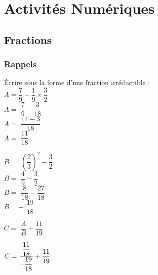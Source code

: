 \ifdefined\COMPLETE
\else
    
    
\fi

\section{Activités Numériques}

\subsection{Fractions}

\subsubsection{Rappels}



Écrire sous la forme d'une fraction irréductible :\\

$ A = ${$\dfrac{7}{9} - \dfrac{1}{9} \times \dfrac{3}{2} $ }\\

$ A = ${  $\dfrac{7}{9} - \dfrac{3}{18} $}\\

$ A = ${  $\dfrac{14-3}{18} $ }\\

$ A = ${  $\dfrac{11}{18} $ }\\

\vspace{1cm}

$ B = ${  $\left(\dfrac{2}{3}\right)^2 - \dfrac{3}{2} $ }\\

$ B = ${  $\dfrac{4}{9} - \dfrac{3}{2} $ }\\

$ B = ${  $\dfrac{8}{18} - \dfrac{27}{18} $} \\

$ B = - ${  $\dfrac{19}{18} $ }\\

\vspace{1cm}

$ C = ${  $\dfrac{A}{B} + \dfrac{11}{19} $ }\\

\vspace{.1cm}

$ C = { \Large \tfrac{\dfrac{11}{18}}{-\dfrac{19}{18}}} + \dfrac{11}{19}$ \\

\vspace{.3cm}

